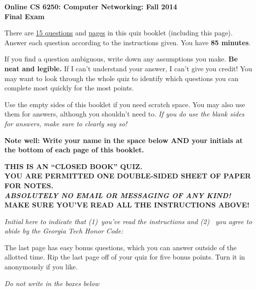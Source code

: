 \documentclass[11pt]{article}
\begin{document}
\begin{center}
{\Large{\bf Online CS 6250: Computer Networking: Fall 2014} \\
 \vspace{.15in} \Huge{\bf Final Exam}} 

\begin{boxedminipage}[h]{6in}
There are \underline{15 questions} and \underline{\pageref{lastpage}
  pages} in this quiz booklet (including this page).  Answer each
question according to the instructions given.  You have {\bf 85
  minutes}.



\vspace{.1in} 
If you find a question ambiguous, write down any
assumptions you make.  {\bf Be neat and legible.}  If I can't
understand your answer, I can't give you credit!  You may want to look
through the whole quiz to identify which questions you can complete most
quickly for the most points.

\vspace{.1in} 
Use the empty sides of this booklet if you need scratch space.  You
may also use them for answers, although you shouldn't need to.  {\em If you
do use the blank sides for answers, make sure to clearly say so!}

\vspace{.1in} 
{\bf Note well: Write your name in the space below AND your initials at the bottom of each
page of this booklet.}

\begin{center}{\bf THIS IS AN ``CLOSED BOOK'' QUIZ.\\
YOU ARE PERMITTED ONE DOUBLE-SIDED SHEET OF PAPER FOR NOTES.\\
{\em ABSOLUTELY NO EMAIL OR MESSAGING OF ANY KIND!} \\
MAKE SURE YOU'VE READ ALL THE INSTRUCTIONS ABOVE!}
\end{center}
{\em Initial here to indicate that (1)~you've read the instructions and (2)~
you agree to abide by the Georgia Tech Honor Code: }

\vspace{.1in} The last page has easy bonus questions, which you can
answer outside of the allotted time.  Rip the last page off of your
quiz for five bonus points.  Turn it in anonymously if you like.

\end{boxedminipage}
\end{center}
\vspace*{0.25in}
\begin{center}
{\it Do not write in the boxes below}
\end{center}
\end{document}
